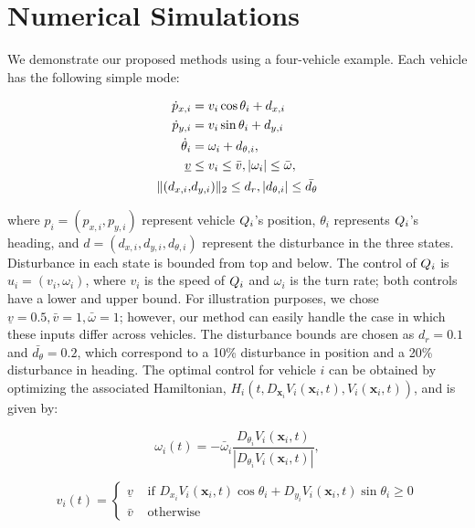 \section{Numerical Simulations \label{sec:sim}}
We demonstrate our proposed methods using a four-vehicle example. Each vehicle has the following simple mode:

\begin{equation}
\label{eq:dyn_i}
\begin{aligned}
\dot{p}_{x,i} &= v_i \cos \theta_i + d_{x,i} \\
\dot{p}_{y,i} &= v_i \sin \theta_i + d_{y,i}\\
\dot{\theta}_i &= \omega_i + d_{\theta,i}, \\
\underline{v} & \le v_i \le \bar{v}, |\omega_i| \le \bar{\omega},\\
\|(d_{x,i}, & d_{y,i}) \|_2 \le d_{r}, |d_{\theta,i}| \le \bar{d_{\theta}}
\end{aligned}
\end{equation}

\noindent where $p_i = (p_{x,i}, p_{y,i})$ represent vehicle $Q_i$'s position, $\theta_i$ represents $Q_i$'s heading, and $d = (d_{x,i}, d_{y,i}, d_{\theta,i})$ represent the disturbance in the three states. Disturbance in each state is bounded from top and below. The control of $Q_i$ is $u_i = (v_i, \omega_i)$, where $v_i$ is the speed of $Q_i$ and $\omega_i$ is the turn rate; both controls have a lower and upper bound. For illustration purposes, we chose $\underline{v} = 0.5, \bar{v} = 1, \bar\omega = 1$; however, our method can easily handle the case in which these inputs differ across vehicles. The disturbance bounds are chosen as $d_{r} = 0.1$ and $\bar{d_{\theta}} = 0.2$, which correspond to a 10\% disturbance in position and a 20\% disturbance in heading. The optimal control for vehicle $i$ can be obtained by optimizing the associated Hamiltonian, $H_i(t, D_{\bm{x}_i} V_i(\bm{x}_i,t), V_i(\bm{x}_i,t))$, and is given by:

\begin{equation}
\omega_i(t) = -\bar{\omega}_i \frac{D_{\theta_i}V_i(\bm{x}_i,t)}{\left| D_{\theta_i}V_i(\bm{x}_i,t) \right|},
\end{equation}

\begin{equation}
v_i(t) =
\left \{ 
\begin{array}{ll}
\underline{v} & \mbox{ if } D_{x_i}V_i(\bm{x}_i,t) \cos \theta_i + D_{y_i}V_i(\bm{x}_i,t) \sin \theta_i \geq 0 \\
\bar{v} & \mbox{ otherwise } 
\end{array}
\right.
\end{equation}

